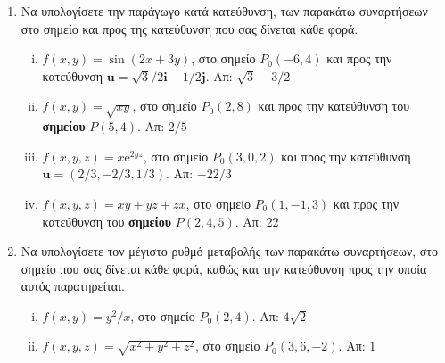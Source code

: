 



\pagestyle{askhseis}
\renewcommand{\vec}{\mathbf}

\linespread{1.3}



\begin{center}
  \minibox{\large \bfseries \textcolor{Col1}{Ασκήσεις στην Παράγωγο κατά Κατεύθυνση}}
\end{center}

\vspace{\baselineskip}

\begin{enumerate}
  \item Να υπολογίσετε την παράγωγο κατά κατεύθυνση, των παρακάτω συναρτήσεων στο σημείο 
    και προς της κατεύθυνση που σας δίνεται κάθε φορά.
    \begin{enumerate}[i)]
      \item $ f(x,y) = \sin{(2x+3y)} $, στο σημείο $ P_{0}(-6,4) $ και προς την
        κατεύθυνση  $ \mathbf{u} = \sqrt{3} /2 \mathbf{i} - 1/2 \mathbf{j}$. 
        \hfill Απ: $ \sqrt{3} - 3/2 $ 
      \item $ f(x,y) = \sqrt{xy} $, στο σημείο $ P_{0}(2,8) $ και προς την
        κατεύθυνση του \textbf{σημείου} $P(5,4) $. \hfill Απ: $ 2 / 5 $ 
      \item $ f(x,y,z) = x \mathrm{e}^{2yz} $, στο σημείο $ P_{0}(3,0,2) $ και προς την
        κατεύθυνση  $ \mathbf{u} = (2/3, -2/3 , 1/3) $. 
        \hfill Απ: $-22/3$ 
      \item $ f(x,y,z) = xy+yz+zx $, στο σημείο $ P_{0}(1,-1,3) $ και προς την
        κατεύθυνση  του \textbf{σημείου} $P(2,4,5)$. 
        \hfill Απ: 22
    \end{enumerate}

  \item Να υπολογίσετε τον μέγιστο ρυθμό μεταβολής των παρακάτω συναρτήσεων, στο σημείο 
    που σας δίνεται κάθε φορά, καθώς και την κατεύθυνση προς την οποία αυτός 
    παρατηρείται.
    \begin{enumerate}[i)]
      \item $ f(x,y) = y^{2}/x $, στο σημείο $ P_{0}(2,4) $.
        \hfill Απ: $4 \sqrt{2}$ 
      \item $ f(x,y,z) = \sqrt{x^{2}+y^{2}+z^{2}} $, στο σημείο $ P_{0}(3,6,-2) $.
        \hfill Απ: $ 1 $
    \end{enumerate}


\end{enumerate}
